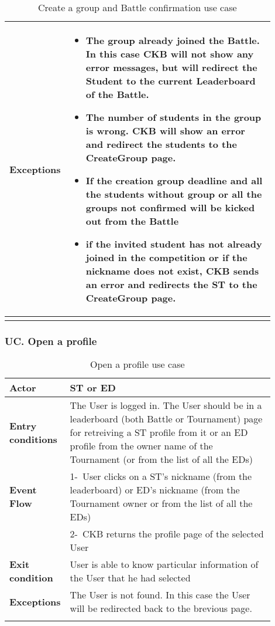 \begin{center}
\begin{longtable}{|l|p{0.9\linewidth}|}
        \textbf{Exceptions}        & \begin{itemize}
            \item The group already joined the Battle. In this case CKB will not show any error messages, but will redirect the Student to the current Leaderboard of the Battle.
            \item The number of students in the group is wrong. CKB will show an error and redirect the students to the CreateGroup page.
            \item If the creation group deadline and all the students without group or all the groups not confirmed will be kicked out from the Battle
            \item if the invited student has not already joined in the competition or if the nickname does not exist, CKB sends an error and redirects the ST to the CreateGroup page.
         \end{itemize}    \\
        \hline
        \caption{Create a group and Battle confirmation use case}
        \label{tab: create_a_group_and_Battle_confirmation_use_case}
    \end{longtable}
\end{center}

\subsubsection*{UC\cuc . Open a profile}
\begin{center}
    \begin{longtable}{|l|p{0.9\linewidth}|}
        \hline
        \textbf{Actor}            & ST or ED                                                                                                                                                                                       \\
        \hline
        \textbf{Entry conditions} & The User is logged in. The User should be in a leaderboard (both Battle or Tournament) page for retreiving a ST profile from it or an ED profile from the owner name of the Tournament (or from the list of all the EDs)        \\
        \hline
        \textbf{Event Flow}       & 1-\ User clicks on a ST's nickname (from the leaderboard) or ED's nickname (from the Tournament owner or from the list of all the EDs)        \\
        & 2-\ CKB returns the profile page of the selected User        \\
        \hline
        \textbf{Exit condition}   & User is able to know particular information of the User that he had selected        \\
        \hline
        \textbf{Exceptions}        &  The User is not found. In this case the User will be redirected back to the brevious page.\\
        \hline
        \caption{Open a profile use case}
        \label{tab: open_a_profile_use_case}
    \end{longtable}
\end{center}

